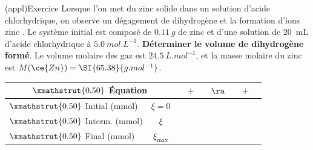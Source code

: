 \documentclass[../../main/main.tex]{subfiles}
\begin{document}
\begin{tcb}[width=\linewidth, breakable](appl){Exercice}
	Lorsque l'on met du zinc solide dans un solution d'acide chlorhydrique, on
	observe un dégagement de dihydrogène et la formation d'ions zinc
	.
	\smallbreak
	Le système initial est composé de $\SI{0.11}{g}$ de zinc et
	d'une solution de \SI{20}{mL} d'acide chlorhydrique à $\SI{5.0}{mol.L^{-1}}$.
	\smallbreak
	\textbf{Déterminer le volume de dihydrogène formé}.
	\smallbreak
	Le volume molaire des gaz est $\SI{24.5}{L.mol^{-1}}$, et la masse molaire du
	zinc est $M(\ce{Zn}) = \SI{65.38}{g.mol^{-1}}$.
	\tcblower
	\begin{center}
		\def\rhgt{0.50}
		\centering
		\begin{tabularx}{\linewidth}{|l|c|YdYdYdY|}
			\hline
			\multicolumn{2}{|c|}{
				$\xmathstrut{\rhgt}$
			\textbf{Équation}}         &
			        & $+$          &
			       & $\ra$        &
			 & $+$          &
			                       \\
			\hline
			$\xmathstrut{\rhgt}$
			Initial (\si{mmol})        & $\xi = 0$    &
			         & \vline       &
			          & \vline       &
			            & \vline       &
			                             \\
			\hline
			$\xmathstrut{\rhgt}$
			Interm. (\si{mmol})        & $\xi$        &
			    & \vline       &
			    & \vline       &
			\psw{$\xi$}                & \vline       &
			\psw{$\xi$}                                 \\
			\hline
			$\xmathstrut{\rhgt}$
			Final (\si{mmol})          & $\xi_{\max}$ &
			            & \vline       &
			        & \vline       &
			         & \vline       &
			                          \\
			\hline
		\end{tabularx}
	\end{center}
\end{tcb}
\end{document}
